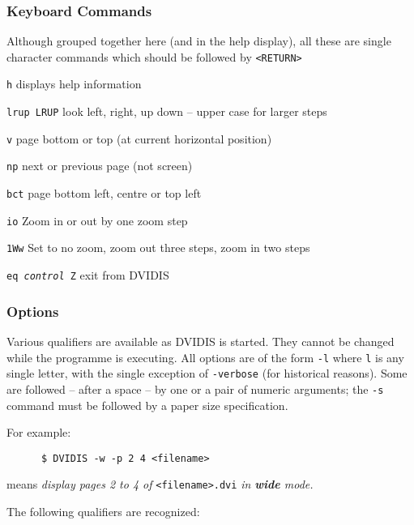 \subsubsection{Keyboard Commands}

Although grouped together here (and in the help display), all these are
single character commands which should be followed by {\tt<RETURN>}

\begin{list}%
{}%
{
\settowidth{\labelsep}{aaaa}
\addtolength{\labelwidth}{\labelsep}
\setlength{\leftmargin}{\labelwidth}}
%
\item[{\tt h}]  displays help information
\item[{\tt lrup LRUP}] look left, right, up down -- upper case for larger steps
\item[{\tt v\symbol{94}}] page bottom or top (at current horizontal position)
\item[{\tt np}]  next or previous page (not screen)
\item[{\tt bct}]  page bottom left, centre or top left
\item[{\tt io}]  Zoom in or out by one zoom step
\item[{\tt 1Ww}]  Set to no zoom, zoom out three steps, zoom in two steps
\item[{\tt eq {\em control} Z}] exit from DVIDIS
\end{list}

\subsubsection{Options}

Various qualifiers are available as DVIDIS is started. They cannot be
changed while the programme is executing. 
All options are of the form {\tt-l}
where {\tt l} is any single letter, with the single exception of 
{\tt-verbose} (for historical reasons).
Some are followed -- after a space -- by one or a pair of
numeric arguments; the {\tt-s} command must be followed by a paper size
specification.

For example:
\begin{verbatim}
      $ DVIDIS -w -p 2 4 <filename> 
\end{verbatim}
means {\sl display pages 2 to 4 of }{\tt <filename>.dvi}{\sl\/ in 
{\bf wide} mode.}

The following qualifiers are recognized:

